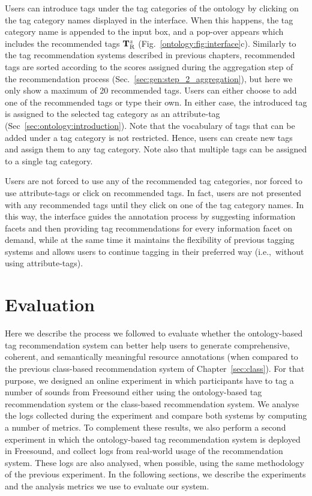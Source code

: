 Users can introduce tags under the tag categories of the ontology by clicking on the tag category names displayed in the interface. When this happens, the tag category name is appended to the input box, and a pop-over appears which includes the recommended tags $\mathbf{T}_{\text{R}}^z$ (Fig.~\ref{ontology:fig:interface}c). 
Similarly to the tag recommendation systems described in previous chapters, recommended tags are sorted according to the scores assigned during the aggregation step of the recommendation process (Sec.~\ref{sec:gen:step_2_aggregation}), but here we only show a maximum of 20 recommended tags.
Users can either choose to add one of the recommended tags or type their own. In either case, the introduced tag is assigned to the selected tag category as an attribute-tag (Sec~\ref{sec:ontology:introduction}).
Note that the vocabulary of tags that can be added under a tag category is not restricted. Hence, users can create new tags and assign them to any tag category.
Note also that multiple tags can be assigned to a single tag category.

Users are not forced to use any of the recommended tag categories, nor forced to use attribute-tags or click on recommended tags. In fact, users are not presented with any recommended tags until they click on one of the tag category names. In this way, the interface guides the annotation process by suggesting information facets and then providing tag recommendations for every information facet on demand, while at the same time it maintains the flexibility of previous tagging systems and allows users to continue tagging in their preferred way (i.e.,~without using attribute-tags).





\section{Evaluation}
\label{sec:ontology:evaluation_method}

Here we describe the process we followed to evaluate whether the ontology-based tag recommendation system can better help users to generate comprehensive, coherent, and semantically meaningful resource annotations (when compared to the previous class-based recommendation system of Chapter~\ref{sec:class}).
For that purpose, we designed an online experiment in which participants have to tag a number of sounds from Freesound either using the ontology-based tag recommendation system or the class-based recommendation system. We analyse the logs collected during the experiment and compare both systems by computing a number of metrics.
To complement these results, we also perform a second experiment in which the ontology-based tag recommendation system is deployed in Freesound, and collect logs from real-world usage of the recommendation system. These logs are also analysed, when possible, using the same methodology of the previous experiment.
In the following sections, we describe the experiments and the analysis metrics we use to evaluate our system.

